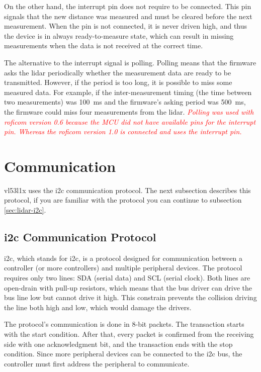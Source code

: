 \documentclass[
  digital,     %
  oneside,     %
  nosansbold,  %
  nocolorbold, %
  lof,         %
  lot,         %
]{fithesis4}
\newcommand{\TODO}[1]{\textcolor{red}{\textit{#1}}}
\begin{document}
On the other hand, the interrupt pin does not require to be connected. This pin signals that the new distance was measured and must be cleared before the next measurement. When the pin is not connected, it is never driven high, and thus the device is in always ready-to-measure state, which can result in missing measurements when the data is not received at the correct time.

The alternative to the interrupt signal is polling. Polling means that the firmware asks the \acrshort{lidar} periodically whether the measurement data are ready to be transmitted. However, if the period is too long, it is possible to miss some measured data. For example, if the inter-measurement timing (the time between two measurements) was \qty{100}{\milli\second} and the firmware's asking period was \qty{500}{\milli\second}, the firmware could miss four measurements from the \acrshort{lidar}. \TODO{Polling was used with \acrshort{roficom} version 0.6 because the MCU did not have available pins for the interrupt pin. Whereas the \acrshort{roficom} version 1.0 is connected and uses the interrupt pin.}

\section{ Communication }
\gls{vl53l1x} uses the \acrshort{i2c} communication protocol. The next subsection describes this protocol, if you are familiar with the protocol you can continue to subsection \ref{sec:lidar-i2c}.

\subsection[ Inter-Integrated Circuit Communication Protocol ]{ \acrlong{i2c} Communication Protocol }
\acrshort{i2c}, which stands for \acrlong{i2c}, is a protocol designed for communication between a controller (or more controllers) and multiple peripheral devices. The protocol requires only two lines: SDA (serial data) and SCL (serial clock). Both lines are open-drain with pull-up resistors, which means that the bus driver can drive the bus line low but cannot drive it high. This constrain prevents the collision  driving the line both high and low, which would damage the drivers.

The protocol's communication is done in 8-bit packets. The transaction starts with the start condition. After that, every packet is confirmed from the receiving side with one acknowledgment bit, and the transaction ends with the stop condition. Since more peripheral devices can be connected to the \acrshort{i2c} bus, the controller must first address the peripheral to communicate.
\end{document}
